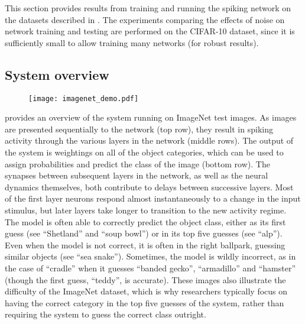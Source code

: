 This section provides results from training and running
the spiking network on the datasets described in .
The experiments comparing the effects of noise on network training and testing
are performed on the CIFAR-10 dataset,
since it is sufficiently small to allow training many networks (for robust results).


\subsection{System overview}

\begin{figure}
  \centering
  \texttt{[image: imagenet\_demo.pdf]}
\end{figure}

 provides an overview of the system
running on ImageNet test images.
As images are presented sequentially to the network (top row),
they result in spiking activity through the various layers in the network
(middle rows).
The output of the system is weightings on all of the object categories,
which can be used to assign probabilities and predict the class of the image
(bottom row).
The synapses between subsequent layers in the network,
as well as the neural dynamics themselves,
both contribute to delays between successive layers.
Most of the first layer neurons respond almost instantaneously
to a change in the input stimulus,
but later layers take longer to transition to the new activity regime.
The model is often able to correctly predict the object class,
either as its first guess (see ``Shetland'' and ``soup bowl'')
or in its top five guesses (see ``alp'').
Even when the model is not correct, it is often in the right ballpark,
guessing similar objects (see ``sea snake'').
Sometimes, the model is wildly incorrect,
as in the case of ``cradle'' when it guesses ``banded gecko'',
``armadillo'' and ``hamster''
(though the first guess, ``teddy'', is accurate).
These images also illustrate the difficulty of the ImageNet dataset,
which is why researchers typically focus on having the correct category
in the top five guesses of the system,
rather than requiring the system to guess the correct class outright.


